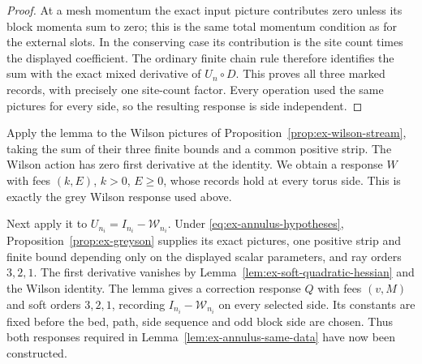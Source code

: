 \begin{proof}
At a mesh momentum the exact input picture contributes zero unless
its block momenta sum to zero; this is the same total momentum condition
as for the external slots. In the conserving case its contribution is
the site count times the displayed coefficient. The ordinary finite
chain rule therefore identifies the sum with the exact mixed derivative
of $U_n\circ D$. This proves all three marked records, with precisely
one site-count factor. Every operation used the same pictures for every
side, so the resulting response is side independent.
\end{proof}

Apply the lemma to the Wilson pictures of
Proposition~\ref{prop:ex-wilson-stream}, taking the sum of their three
finite bounds and a common positive strip. The Wilson action has zero
first derivative at the identity. We obtain a response $W$ with fees
$(k,E)$, $k>0$, $E\geq0$, whose records hold at every torus side.
This is exactly the grey Wilson response used above.

Next apply it to $U_{n_i}=I_{n_i}-\mathcal W_{n_i}$. Under
\eqref{eq:ex-annulus-hypotheses},
Proposition~\ref{prop:ex-greyson} supplies its exact pictures, one
positive strip and finite bound depending only on the displayed scalar
parameters, and ray orders $3,2,1$. The first derivative vanishes by
Lemma~\ref{lem:ex-soft-quadratic-hessian} and the Wilson identity.
The lemma gives a correction response $Q$ with fees $(v,M)$ and soft
orders $3,2,1$, recording $I_{n_i}-\mathcal W_{n_i}$ on every selected
side. Its constants are fixed before the bed, path, side sequence and
odd block side are chosen. Thus both responses required in
Lemma~\ref{lem:ex-annulus-same-data} have now been constructed.

